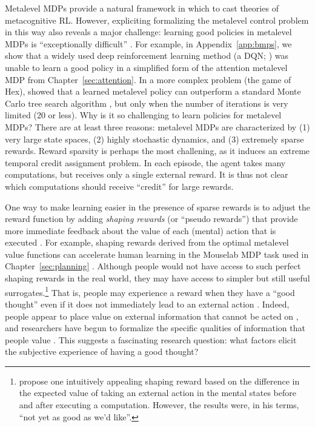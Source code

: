 Metalevel MDPs provide a natural framework in which to cast theories of metacognitive RL. However, expliciting formalizing the metalevel control problem in this way also reveals a major challenge: learning good policies in metalevel MDPs is ``exceptionally difficult'' \citep{hay2016principles}. For example, in Appendix~\ref{app:bmps}, we show that a widely used deep reinforcement learning method (a DQN; \citealp{mnih2015humanlevel}) was unable to learn a good policy in a simplified form of the attention metalevel MDP from Chapter~\ref{sec:attention}. In a more complex problem (the game of Hex), \citet{hay2016principles} showed that a learned metalevel policy can outperform a standard Monte Carlo tree search algorithm \citep{kocsis2006bandit}, but only when the number of iterations is very limited (20 or less). Why is it so challenging to learn policies for metalevel MDPs? There are at least three reasons: metalevel MDPs are characterized by (1) very large state spaces, (2) highly stochastic dynamics, and (3) extremely sparse rewards. Reward sparsity is perhaps the most challening, as it induces an extreme temporal credit assignment problem. In each episode, the agent takes many computations, but receives only a single external reward. It is thus not clear which computations should receive ``credit'' for large rewards. 

One way to make learning easier in the presence of sparse rewards is to adjust the reward function by adding \emph{shaping rewards} (or ``pseudo rewards'') that provide more immediate feedback about the value of each (mental) action that is executed \citep{ng1999policy}. For example, shaping rewards derived from the optimal metalevel value functions can accelerate human learning in the Mouselab MDP task used in Chapter~\ref{sec:planning} \citep{callaway2022leveraging}. Although people would not have access to such perfect shaping rewards in the real world, they may have access to simpler but still useful surrogates.\footnote{%
  \citet{hay2016principles} propose one intuitively appealing shaping reward based on the difference in the expected value of taking an external action in the mental states before and after executing a computation. However, the results were, in his terms, ``not yet as good as we’d like''.
} That is, people may experience a reward when they have a ``good thought'' even if it does not immediately lead to an external action \citep{gopnik1998explanation}. Indeed, people appear to place value on external information that cannot be acted on \citep{eliaz2007experimental,gottlieb2018neuroscience}, and researchers have begun to formalize the specific qualities of information that people value \citep{markant2014preference,markant2016selfdirected}. This suggests a fascinating research question: what factors elicit the subjective experience of having a good thought?


